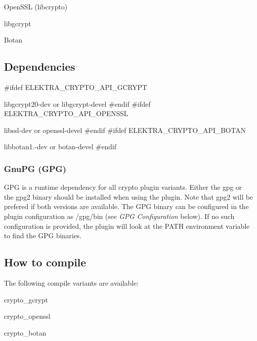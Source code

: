 \begin{DoxyItemize}
\item Open\+S\+S\+L (libcrypto)
\item libgcrypt
\item Botan
\end{DoxyItemize}

\subsection*{Dependencies}

\#ifdef E\+L\+E\+K\+T\+R\+A\+\_\+\+C\+R\+Y\+P\+T\+O\+\_\+\+A\+P\+I\+\_\+\+G\+C\+R\+Y\+P\+T
\begin{DoxyItemize}
\item {\ttfamily libgcrypt20-\/dev} or {\ttfamily libgcrypt-\/devel} \#endif \#ifdef E\+L\+E\+K\+T\+R\+A\+\_\+\+C\+R\+Y\+P\+T\+O\+\_\+\+A\+P\+I\+\_\+\+O\+P\+E\+N\+S\+S\+L
\item {\ttfamily libssl-\/dev} or {\ttfamily openssl-\/devel} \#endif \#ifdef E\+L\+E\+K\+T\+R\+A\+\_\+\+C\+R\+Y\+P\+T\+O\+\_\+\+A\+P\+I\+\_\+\+B\+O\+T\+A\+N
\item {\ttfamily libbotan1.-\/dev} or {\ttfamily botan-\/devel} \#endif
\end{DoxyItemize}

\subsubsection*{Gnu\+P\+G (G\+P\+G)}

G\+P\+G is a runtime dependency for all crypto plugin variants. Either the {\ttfamily gpg} or the {\ttfamily gpg2} binary should be installed when using the plugin. Note that {\ttfamily gpg2} will be prefered if both versions are available. The G\+P\+G binary can be configured in the plugin configuration as {\ttfamily /gpg/bin} (see {\itshape G\+P\+G Configuration} below). If no such configuration is provided, the plugin will look at the P\+A\+T\+H environment variable to find the G\+P\+G binaries.

\subsection*{How to compile}

The following compile variants are available\+:


\begin{DoxyEnumerate}
\item crypto\+\_\+gcrypt
\item crypto\+\_\+openssl
\item crypto\+\_\+botan
\end{DoxyEnumerate}

